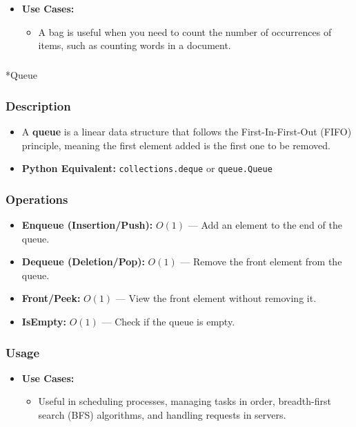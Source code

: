 \documentclass[
  letterpaper,
  DIV=11,
  numbers=noendperiod]{scrreprt}
\makeatletter
\let\oldsubparagraph\subparagraph
\renewcommand{\subparagraph}{
    \@ifstar
      \xxxSubParagraphStar
      \xxxSubParagraphNoStar
  }
\newcommand{\xxxSubParagraphStar}[1]{\oldsubparagraph*{#1}\mbox{}}
\newcommand{\xxxSubParagraphNoStar}[1]{\oldsubparagraph{#1}\mbox{}}
\providecommand{\tightlist}{%
  \setlength{\itemsep}{0pt}\setlength{\parskip}{0pt}}
\makeatother
\begin{document}
\begin{itemize}
\item
  \textbf{Use Cases:}

  \begin{itemize}
  \tightlist
  \item
    A bag is useful when you need to count the number of occurrences of
    items, such as counting words in a document.
  \end{itemize}
\end{itemize}

\subparagraph*{Queue}\label{queue}

\subsubsection{Description}

\begin{itemize}
\tightlist
\item
  A \textbf{queue} is a linear data structure that follows the
  First-In-First-Out (FIFO) principle, meaning the first element added
  is the first one to be removed.
\item
  \textbf{Python Equivalent:} \texttt{collections.deque} or
  \texttt{queue.Queue}
\end{itemize}

\subsubsection{Operations}

\begin{itemize}
\tightlist
\item
  \textbf{Enqueue (Insertion/Push):} \(O(1)\) --- Add an element to the
  end of the queue.
\item
  \textbf{Dequeue (Deletion/Pop):} \(O(1)\) --- Remove the front element
  from the queue.
\item
  \textbf{Front/Peek:} \(O(1)\) --- View the front element without
  removing it.
\item
  \textbf{IsEmpty:} \(O(1)\) --- Check if the queue is empty.
\end{itemize}

\subsubsection{Usage}

\begin{itemize}
\item
  \textbf{Use Cases:}

  \begin{itemize}
  \tightlist
  \item
    Useful in scheduling processes, managing tasks in order,
    breadth-first search (BFS) algorithms, and handling requests in
    servers.
  \end{itemize}
\end{itemize}
\end{document}
